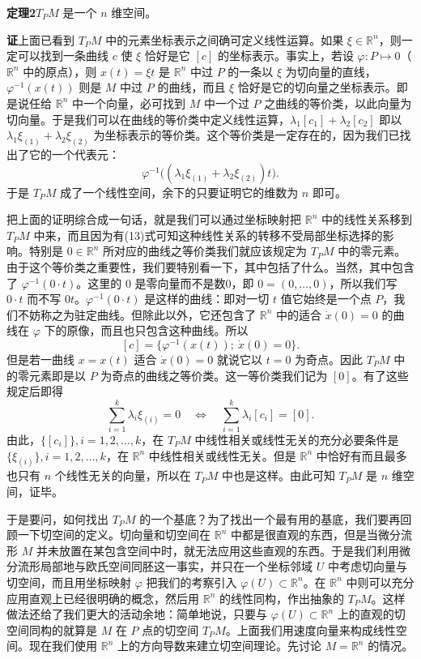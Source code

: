 \noindent\textbf{定理2}\quad $T_PM$ 是一个 $n$ 维空间。

\noindent\textbf{证}\quad 上面已看到 $T_PM$ 中的元素坐标表示之间确可定义线性运算。如果 $\xi\in\mathbb R^n$，则一定可以找到一条曲线 $c$ 使 $\xi$ 恰好是它 $[c]$ 的坐标表示。事实上，若设 $\varphi:P\mapsto0$（$\mathbb R^n$ 中的原点），则 $x(t)=\xi t$ 是 $\mathbb R^n$ 中过 $P$ 的一条以 $\xi$ 为切向量的直线，$\varphi^{-1}(x(t))$ 则是 $M$ 中过 $P$ 的曲线，而且 $\xi$ 恰好是它的切向量之坐标表示。即是说任给 $\mathbb R^n$ 中一个向量，必可找到 $M$ 中一个过 $P$ 之曲线的等价类，以此向量为切向量。于是我们可以在曲线的等价类中定义线性运算，$\lambda_1[c_1]+\lambda_2[c_2]$ 即以 $\lambda_1\xi_{(1)}+\lambda_2\xi_{(2)}$ 为坐标表示的等价类。这个等价类是一定存在的，因为我们已找出了它的一个代表元：
\[
 \varphi^{-1}\bigl((\lambda_1\xi_{(1)}+\lambda_2\xi_{(2)})t\bigr).
\]
于是 $T_PM$ 成了一个线性空间，余下的只要证明它的维数为 $n$ 即可。

把上面的证明综合成一句话，就是我们可以通过坐标映射把 $\mathbb R^n$ 中的线性关系移到 $T_PM$ 中来，而且因为有(13)式可知这种线性关系的转移不受局部坐标选择的影响。特别是 $0\in\mathbb R^n$ 所对应的曲线之等价类我们就应该规定为 $T_PM$ 中的零元素。由于这个等价类之重要性，我们要特别看一下，其中包括了什么。当然，其中包含了 $\varphi^{-1}(0\cdot t)$。这里的 $0$ 是零向量而不是数0，即 $0=(0,\ldots,0)$，所以我们写 $0\cdot t$ 而不写 $0t$。$\varphi^{-1}(0\cdot t)$ 是这样的曲线：即对一切 $t$ 值它始终是一个点 $P$，我们不妨称之为驻定曲线。但除此以外，它还包含了 $\mathbb R^n$ 中的适合 $\dot x(0)=0$ 的曲线在 $\varphi$ 下的原像，而且也只包含这种曲线。所以
\[
 [c]=\{\varphi^{-1}(x(t));\ \dot x(0)=0\}.
\]
但是若一曲线 $x=x(t)$ 适合 $\dot x(0)=0$ 就说它以 $t=0$ 为奇点。因此 $T_PM$ 中的零元素即是以 $P$ 为奇点的曲线之等价类。这一等价类我们记为 $[0]$。有了这些规定后即得
\begin{equation}
 \sum_{i=1}^k\lambda_i\xi_{(i)}=0
 \quad\Longleftrightarrow\quad
 \sum_{i=1}^k\lambda_i[c_i]=[0].
 \tag{14}
\end{equation}
由此，$\{[c_i]\},i=1,2,\ldots,k$，在 $T_PM$ 中线性相关或线性无关的充分必要条件是 $\{\xi_{(i)}\},i=1,2,\ldots,k$，在 $\mathbb R^n$ 中线性相关或线性无关。但是 $\mathbb R^n$ 中恰好有而且最多也只有 $n$ 个线性无关的向量，所以在 $T_PM$ 中也是这样。由此可知 $T_PM$ 是 $n$ 维空间，证毕。

于是要问，如何找出 $T_PM$ 的一个基底？为了找出一个最有用的基底，我们要再回顾一下切空间的定义。切向量和切空间在 $\mathbb R^n$ 中都是很直观的东西，但是当微分流形 $M$ 并未放置在某包含空间中时，就无法应用这些直观的东西。于是我们利用微分流形局部地与欧氏空间同胚这一事实，并只在一个坐标邻域 $U$ 中考虑切向量与切空间，而且用坐标映射 $\varphi$ 把我们的考察引入 $\varphi(U)\subset\mathbb R^n$。在 $\mathbb R^n$ 中则可以充分应用直观上已经很明确的概念，然后用 $\mathbb R^n$ 的线性同构，作出抽象的 $T_PM$。这样做法还给了我们更大的活动余地：简单地说，只要与 $\varphi(U)\subset\mathbb R^n$ 上的直观的切空间同构的就算是 $M$ 在 $P$ 点的切空间 $T_PM$。上面我们用速度向量来构成线性空间。现在我们使用 $\mathbb R^n$ 上的方向导数来建立切空间理论。先讨论 $M=\mathbb R^n$ 的情况。

